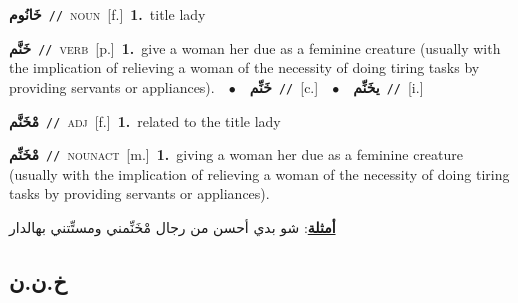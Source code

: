 \documentclass[10pt,a4paper,twoside]{article} %
\begin{document}
\begin{multicols}{2}
{\setlength\topsep{0pt}\textbf{\foreignlanguage{arabic}{خَانُوم}}\ {\color{gray}\texttt{//}\color{black}}\ \textsc{noun}\ [f.]\ \textbf{1.}~title lady\ } \vspace{2mm}

{\setlength\topsep{0pt}\textbf{\foreignlanguage{arabic}{خَنَّم}}\ {\color{gray}\texttt{//}\color{black}}\ \textsc{verb}\ [p.]\ \textbf{1.}~give a woman her due as a feminine creature (usually with the implication of relieving a woman of the necessity of doing tiring tasks by providing servants or appliances).\ \ $\bullet$\ \ \setlength\topsep{0pt}\textbf{\foreignlanguage{arabic}{خَنِّم}}\ {\color{gray}\texttt{//}\color{black}}\ [c.]\ \ $\bullet$\ \ \setlength\topsep{0pt}\textbf{\foreignlanguage{arabic}{يخَنِّم}}\ {\color{gray}\texttt{//}\color{black}}\ [i.]\ } \vspace{2mm}

{\setlength\topsep{0pt}\textbf{\foreignlanguage{arabic}{مْخَنَّم}}\ {\color{gray}\texttt{//}\color{black}}\ \textsc{adj}\ [f.]\ \textbf{1.}~related to the title lady\ } \vspace{2mm}

{\setlength\topsep{0pt}\textbf{\foreignlanguage{arabic}{مْخَنِّم}}\ {\color{gray}\texttt{//}\color{black}}\ \textsc{noun\textunderscore act}\ [m.]\ \textbf{1.}~giving a woman her due as a feminine creature (usually with the implication of relieving a woman of the necessity of doing tiring tasks by providing servants or appliances).\  \begin{flushright}\color{gray}\foreignlanguage{arabic}{\textbf{\underline{\foreignlanguage{arabic}{أمثلة}}}: شو بدي أحسن من رجال مْخَنِّمني ومستِّتني بهالدار}\end{flushright}\color{black}} \vspace{2mm}

\vspace{-3mm}
\subsection*{\color{blue}\foreignlanguage{arabic}{خ.ن.ن}\color{blue}{}} 


\end{multicols}
\end{document}

